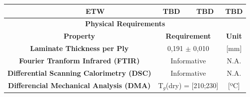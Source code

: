 \begin{table}[htbp]
{\begin{tabular}{@{}ccccc@{}}
\multicolumn{1}{c|}{}                                                        & \multicolumn{1}{c|}{ETW}                                                                    & \multicolumn{1}{c|}{TBD}                   & \multicolumn{1}{c|}{TBD}                      & TBD                                                     \\ \midrule
\multicolumn{5}{c}{\textbf{Physical Requirements}}                                                                                                                                                                                                                                                                                \\ \midrule
\multicolumn{2}{c|}{\textbf{Property}}                                                                                                                                     & \multicolumn{2}{c|}{\textbf{Requirement}}                                                  & \textbf{Unit}                                           \\ \midrule
\multicolumn{2}{c|}{\textbf{Laminate Thickness per Ply}}                                                                                                                   & \multicolumn{2}{c|}{0,191 $\pm$ 0,010}                                                     & {[}mm{]}                                                \\ \midrule
\multicolumn{2}{c|}{\textbf{Fourier Tranform Infrared (FTIR)}}                                                                                                             & \multicolumn{2}{c|}{Informative}                                                           & N.A.                                                    \\ \midrule
\multicolumn{2}{c|}{\textbf{Differential Scanning Calorimetry (DSC)}}                                                                                                      & \multicolumn{2}{c|}{Informative}                                                           & N.A.                                                    \\ \midrule
\multicolumn{2}{c}{\textbf{Differencial Mechanical Analysis (DMA)}}                                                                                                        & \multicolumn{2}{c}{T$_g$(dry)  = {[}210;230{]}}                                            & {[}ºC{]}                                                \\ \bottomrule
\end{tabular}
}
\end{table}
 
